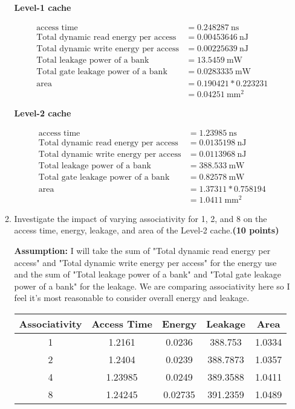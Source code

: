 \documentclass[a4paper, 11pt]{exam}
\begin{document}
\begin{enumerate}
\begin{enumerate}
\textbf{Level-1 cache}

\begin{align*}
\text{access time} &= 0.248287 \ \text{ns}\\
\text{Total dynamic read energy per access} &= 0.00453646 \ \text{nJ}\\
\text{Total dynamic write energy per access} &= 0.00225639 \ \text{nJ}\\
\text{Total leakage power of a bank} &= 13.5459 \ \text{mW} \\
\text{Total gate leakage power of a bank} &= 0.0283335 \ \text{mW} \\
\text{area} &= 0.190421 * 0.223231 \\ 
            &= 0.04251 \ \text{mm}^2   
\end{align*}

\textbf{Level-2 cache}

\begin{align*}
\text{access time} &= 1.23985 \ \text{ns}\\
\text{Total dynamic read energy per access} &= 0.0135198 \ \text{nJ}\\
\text{Total dynamic write energy per access} &= 0.0113968 \ \text{nJ}\\
\text{Total leakage power of a bank} &= 388.533 \ \text{mW} \\
\text{Total gate leakage power of a bank} &= 0.82578 \ \text{mW} \\
\text{area} &= 1.37311 * 0.758194 \\ 
            &= 1.0411 \ \text{mm}^2   
\end{align*}

    \item Investigate the impact of varying associativity for 1, 2, and 8 on the access time, energy, leakage, and area of the Level-2 cache.\textbf{(10 points)}
    
    \textbf{Assumption:} I will take the sum of "Total dynamic read energy per access" and "Total dynamic write energy per access" for the energy use and the sum of "Total leakage power of a bank" and "Total gate leakage power of a bank" for the leakage. We are comparing associativity here so I feel it's most reasonable to consider overall energy and leakage.
    
    \begin{center}
	\begin{tabular}{ |c|c|c|c|c|} 
		\hline
		\textbf{Associativity}& \textbf{Access Time}& \textbf{Energy} & \textbf{Leakage} & \textbf{Area} \\ 
		\hline
		1 & 1.2161 & 0.0236 & 388.753 & 1.0334\\
		\hline
		2 & 1.2404 & 0.0239 & 388.7873 & 1.0357 \\
		\hline
		4 & 1.23985 & 0.0249 & 389.3588 & 1.0411\\
		\hline
		8 & 1.24245 & 0.02735 & 391.2359 & 1.0489\\
		\hline
	\end{tabular}
\end{center}


\end{enumerate}
\end{enumerate}
\end{document}
